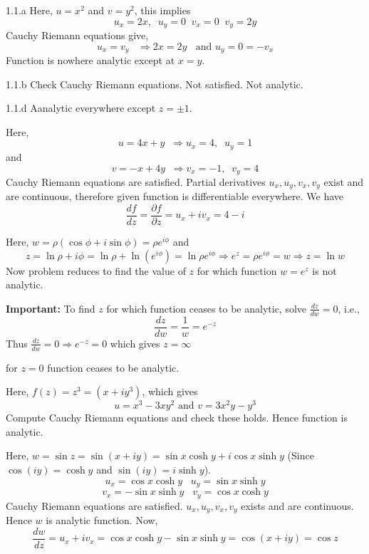 \begin{Solution}{1.1.a}
	Here, $u=x^2$ and $v=y^2$, this implies
	\[u_x=2x,\;\;u_y=0\;\;v_x= 0\;\;v_y=2y\]
	Cauchy Riemann equations give,
	\[u_x=v_y \;\;\; \Rightarrow 2x=2y \;\;\text{ and } u_y=0=-v_x\]
	Function is nowhere analytic except at $x=y$.
	
\end{Solution}
\begin{Solution}{1.1.b}
	Check Cauchy Riemann equations. Not satisfied. Not analytic.
		
\end{Solution}
\begin{Solution}{1.1.d}
Aanalytic everywhere except $z=\pm 1$.
\end{Solution}
\begin{Solution}{1.2}
Here, \[u=4x + y \;\; \Rightarrow u_x=4,\;\;u_y=1\]
and
\[v=-x + 4y \;\; \Rightarrow v_x=-1,\;\;v_y=4\]
Cauchy Riemann equations are satisfied. Partial derivatives $u_x,u_y,v_x,v_y$ exist and are continuous, therefore given function is differentiable everywhere. We have
\[\frac{df}{dz} = \frac{\partial f}{ \partial z} = u_x+iv_x = 4-i\]
\end{Solution}
\begin{Solution}{1.3}
Here, $w=\rho(\cos \phi + i\sin \phi) = \rho e^{i\phi}$ and
\[z=\ln \rho + i\phi = \ln \rho + \ln (e^{i\phi}) = \ln \rho e^{i\phi}  \Rightarrow e^z = \rho e^{i\phi} = w \Rightarrow z = \ln w \]
Now problem reduces to find the value of $z$ for which function $w=e^z$ is not analytic.

\textbf{Important: } To find $z$ for which function ceases to be analytic, solve $\frac{dz}{dw}=0$, i.e.,
\[\frac{dz}{dw} = \frac{1}{w} = e^{-z} \]
Thus $\frac{dz}{dw} = 0  \Rightarrow  e^{-z} =0$
which gives $z=\infty$
\end{Solution}
\begin{Solution}{1.5}
for $z=0$ function ceases to be analytic.
\end{Solution}
\begin{Solution}{1.8}
Here, $f(z) = z^3 = (x+iy^3)$, which gives
\[u=x^3-3xy^2 \text{ and } v=3x^2y-y^3\]
Compute Cauchy Riemann equations and check these holds. Hence function is analytic.
\end{Solution}
\begin{Solution}{1.9}
Here, $w=\sin z = \sin(x+iy) = \sin x \cosh y + i \cos x \sinh y$ (Since $\cos (iy) = \cosh y$ and $\sin (iy) = i \sinh y$).
\[u_x=\cos x \cosh y\;\;\;u_y=\sin x \sinh y\]
\[v_x= - \sin x \sinh y\;\;\; v_y=\cos x \cosh y\]
Cauchy Riemann equations are satisfied. $u_x,u_y,v_x,v_y$ exists and are continuous. Hence $w$ is analytic  function.
Now,
\[\frac{dw}{dz}=u_x+iv_x =\cos x \cosh y-\sin x \sinh y = \cos (x+iy) = \cos z\]
\end{Solution}
